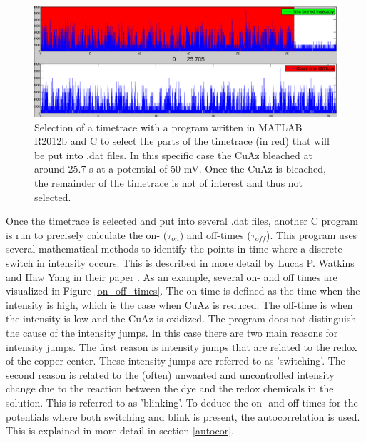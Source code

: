 \documentclass[twoside,single]{lion-msc}
\begin{document}
\begin{figure}[ht!]
\centering
\includegraphics[width=\textwidth]{timetrace_selection}
\caption{Selection of a timetrace with a program written in MATLAB R2012b and C to select the parts of the timetrace (in red) that will be put into .dat files. In this specific case the CuAz bleached at around 25.7 s at a potential of 50 mV. Once the CuAz is bleached, the remainder of the timetrace is not of interest and thus not selected.}
\label{timetrace_selection}
\end{figure}

Once the timetrace is selected and put into several .dat files, another C program is run to precisely calculate the  on- ($\tau_{on}$) and off-times ($\tau_{off}$). This program uses several mathematical methods to identify the points in time where a discrete switch in intensity occurs. This is described in more detail by Lucas P. Watkins and Haw Yang in their paper \cite{And2004}. As an example, several on- and off times are visualized in Figure \ref{on_off_times}. The on-time is defined as the time when the intensity is high, which is the case when CuAz is reduced. The off-time is when the intensity is low and the CuAz is oxidized. The program does not distinguish the cause of the intensity jumps. In this case there are two main reasons for intensity jumps. The first reason is intensity jumps that are related to the redox of the copper center. These intensity jumps are referred to as 'switching'. The second reason is related to the (often) unwanted and uncontrolled intensity change due to the reaction between the dye and the redox chemicals in the solution. This is referred to as 'blinking'. To deduce the on- and off-times for the potentials where both switching and blink is present, the autocorrelation is used. This is explained in more detail in section \ref{autocor}.
\end{document}
